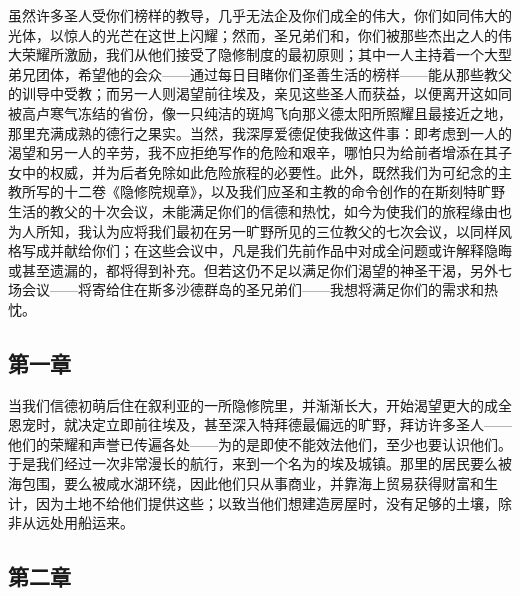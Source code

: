 虽然许多圣人受你们榜样的教导，几乎无法企及你们成全的伟大，你们如同伟大的光体，以惊人的光芒在这世上闪耀；然而，圣兄弟们和，你们被那些杰出之人的伟大荣耀所激励，我们从他们接受了隐修制度的最初原则；其中一人主持着一个大型弟兄团体，希望他的会众——通过每日目睹你们圣善生活的榜样——能从那些教父的训导中受教；而另一人则渴望前往埃及，亲见这些圣人而获益，以便离开这如同被高卢寒气冻结的省份，像一只纯洁的斑鸠飞向那义德太阳所照耀且最接近之地，那里充满成熟的德行之果实。当然，我深厚爱德促使我做这件事：即考虑到一人的渴望和另一人的辛劳，我不应拒绝写作的危险和艰辛，哪怕只为给前者增添在其子女中的权威，并为后者免除如此危险旅程的必要性。此外，既然我们为可纪念的主教所写的十二卷《隐修院规章》，以及我们应圣和主教的命令创作的在斯刻特旷野生活的教父的十次会议，未能满足你们的信德和热忱，如今为使我们的旅程缘由也为人所知，我认为应将我们最初在另一旷野所见的三位教父的七次会议，以同样风格写成并献给你们；在这些会议中，凡是我们先前作品中对成全问题或许解释隐晦或甚至遗漏的，都将得到补充。但若这仍不足以满足你们渴望的神圣干渴，另外七场会议——将寄给住在斯多沙德群岛的圣兄弟们——我想将满足你们的需求和热忱。\par


\subsection{第一章}

\par

当我们信德初萌后住在叙利亚的一所隐修院里，并渐渐长大，开始渴望更大的成全恩宠时，就决定立即前往埃及，甚至深入特拜德最偏远的旷野，拜访许多圣人——他们的荣耀和声誉已传遍各处——为的是即使不能效法他们，至少也要认识他们。于是我们经过一次非常漫长的航行，来到一个名为的埃及城镇。那里的居民要么被海包围，要么被咸水湖环绕，因此他们只从事商业，并靠海上贸易获得财富和生计，因为土地不给他们提供这些；以致当他们想建造房屋时，没有足够的土壤，除非从远处用船运来。\par


\subsection{第二章}

